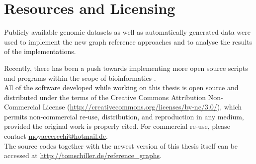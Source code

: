 \documentclass[a4paper,12pt,twoside,BCOR=10mm]{scrbook}
\begin{document}
\section{Resources and Licensing}
%

Publicly available genomic datasets as well as automatically generated data were used
to implement the new graph reference approaches and to analyse the results of the implementations.

Recently, there has been a push towards implementing more open source scripts
and programs within the scope of bioinformatics \citep{MANIFESTO}. \\
All of the software developed while working on this thesis
is open source and distributed under the terms of
the Creative Commons Attribution Non-Commercial License
(\url{http://creativecommons.org/licenses/by-nc/3.0/}),
which permits non-commercial re-use, distribution, and reproduction in any medium,
provided the original work is properly cited.
For commercial re-use, please contact \url{moyaccercchi@hotmail.de}. \\
The source codes together with the newest version of this thesis itself can be accessed at \url{http://tomschiller.de/reference_graphs}.
%

%
%
%
%
\end{document}
